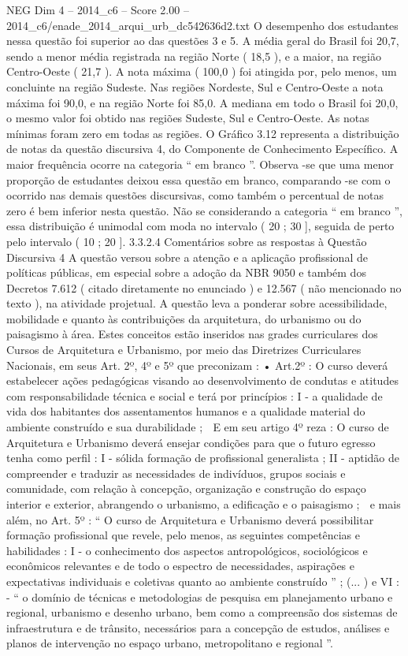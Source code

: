 \begin{textsample}{NEG Dim 4 – 2014\_c6 – Score 2.00 – 2014\_c6/enade\_2014\_arqui\_urb\_dc542636d2.txt}
O desempenho dos estudantes nessa questão foi superior ao das questões 3 e 5.
A média geral do Brasil foi 20,7, sendo a menor média registrada na região Norte ( 18,5 ), e a maior, na região Centro-Oeste ( 21,7 ).
A nota máxima ( 100,0 ) foi atingida por, pelo menos, um concluinte na região Sudeste.
Nas regiões Nordeste, Sul e Centro-Oeste a nota máxima foi 90,0, e na região Norte foi 85,0.
A mediana em todo o Brasil foi 20,0, o mesmo valor foi obtido nas regiões Sudeste, Sul e Centro-Oeste.
As notas mínimas foram zero em todas as regiões.
O Gráfico 3.12 representa a distribuição de notas da questão discursiva 4, do Componente de Conhecimento Específico.
A maior frequência ocorre na categoria “ em branco ”.
Observa -se que uma menor proporção de estudantes deixou essa questão em branco, comparando -se com o ocorrido nas demais questões discursivas, como também o percentual de notas zero é bem inferior nesta questão.
Não se considerando a categoria “ em branco ”, essa distribuição é unimodal com moda no intervalo ( 20 ; 30 ], seguida de perto pelo intervalo ( 10 ; 20 ]. 3.3.2.4 Comentários sobre as respostas à Questão Discursiva 4 A questão versou sobre a atenção e a aplicação profissional de políticas públicas, em especial sobre a adoção da NBR 9050 e também dos Decretos 7.612 ( citado diretamente no enunciado ) e 12.567 ( não mencionado no texto ), na atividade projetual.
A questão leva a ponderar sobre acessibilidade, mobilidade e quanto às contribuições da arquitetura, do urbanismo ou do paisagismo à área.
Estes conceitos estão inseridos nas grades curriculares dos Cursos de Arquitetura e Urbanismo, por meio das Diretrizes Curriculares Nacionais, em seus Art. 2º, 4º e 5º que preconizam : • Art.2º : O curso deverá estabelecer ações pedagógicas visando ao desenvolvimento de condutas e atitudes com responsabilidade técnica e social e terá por princípios : I - a qualidade de vida dos habitantes dos assentamentos humanos e a qualidade material do ambiente construído e sua durabilidade ;  E em seu artigo 4º reza : O curso de Arquitetura e Urbanismo deverá ensejar condições para que o futuro egresso tenha como perfil : I - sólida formação de profissional generalista ; II - aptidão de compreender e traduzir as necessidades de indivíduos, grupos sociais e comunidade, com relação à concepção, organização e construção do espaço interior e exterior, abrangendo o urbanismo, a edificação e o paisagismo ;  e mais além, no Art. 5º : “ O curso de Arquitetura e Urbanismo deverá possibilitar formação profissional que revele, pelo menos, as seguintes competências e habilidades : I - o conhecimento dos aspectos antropológicos, sociológicos e econômicos relevantes e de todo o espectro de necessidades, aspirações e expectativas individuais e coletivas quanto ao ambiente construído ” ; (... ) e VI : - “ o domínio de técnicas e metodologias de pesquisa em planejamento urbano e regional, urbanismo e desenho urbano, bem como a compreensão dos sistemas de infraestrutura e de trânsito, necessários para a concepção de estudos, análises e planos de intervenção no espaço urbano, metropolitano e regional ”.

\end{textsample}
